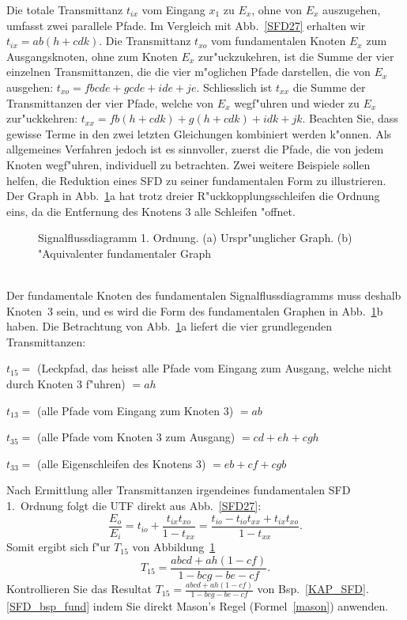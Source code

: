 \nit Die totale Transmittanz $t_{ix}$ vom Eingang $x_1$ zu $E_x$, ohne
von $E_x$ auszugehen, umfasst zwei parallele Pfade. Im Vergleich mit
Abb.~\ref{SFD27} erhalten wir $t_{ix}=ab(h+cdk)$. Die Transmittanz
$t_{xo}$ vom fundamentalen Knoten $E_x$ zum Ausgangsknoten, ohne zum
Knoten $E_x$ zur"uckzukehren, ist die Summe der vier einzelnen
Transmittanzen, die die vier m"oglichen Pfade darstellen, die von
$E_x$ ausgehen: $t_{xo}=fbcde+gcde+ide+je$. Schliesslich ist $t_{xx}$
die Summe der Transmittanzen der vier Pfade, welche von $E_x$
wegf"uhren und wieder zu $E_x$ zur"uckkehren:
$t_{xx}=fb(h+cdk)+g(h+cdk)+idk+jk$. Beachten Sie, dass gewisse Terme
in den zwei letzten Gleichungen kombiniert werden k"onnen. Als
allgemeines Verfahren jedoch ist es sinnvoller, zuerst die Pfade, die
von jedem Knoten wegf"uhren, individuell zu betrachten.
\newpage
\bsp{}\label{SFD_bsp_fund}Zwei weitere Beispiele sollen helfen, die Reduktion eines
 SFD zu seiner fundamentalen Form zu illustrieren. Der
Graph in Abb.~\ref{SFD29}a hat trotz dreier R"uckkopplungsschleifen
die Ordnung eins, da die Entfernung des Knotens 3 alle Schleifen
"offnet. \\
\begin{figure}[htb!]
\begin{center}
  \caption{Signalflussdiagramm 1.  Ordnung.  (a) Urspr"unglicher Graph. (b)
"Aquivalenter fundamentaler Graph}\label{SFD29}
\end{center}
\vspace*{-7mm}
\end{figure}\\
\nit Der fundamentale Knoten des fundamentalen
Signalflussdiagramms muss deshalb Knoten~3 sein, und es wird die Form
des fundamentalen Graphen in Abb.~\ref{SFD29}b haben. Die Betrachtung von
Abb.~\ref{SFD29}a liefert die vier grundlegenden Transmittanzen:\\
\begin{description}
\item $t_{15}=$ (Leckpfad, das heisst alle Pfade vom Eingang zum Ausgang, welche nicht
durch Knoten 3 f"uhren) $= ah$ 
\item $t_{13}=$ (alle Pfade vom Eingang zum Knoten
3) $= ab$ 
\item $t_{35}=$ (alle Pfade vom Knoten 3 zum Ausgang) $= cd + eh + cgh$
\item $t_{33}=$ (alle Eigenschleifen des Knotens 3) $= eb + cf + cgb$
\end{description}
\nit Nach Ermittlung aller Transmittanzen irgendeines fundamentalen
SFD 1.~Ordnung folgt die UTF direkt
aus Abb.~\ref{SFD27}:
\begin{equation}
 \frac{E_o}{E_i}=t_{io}+\frac{t_{ix}t_{xo}}{1-t_{xx}}=\frac{t_{io}-t_{io}t_{xx}+t_{ix}t_{xo}}{1-t_{xx}}.\label{sfd_equ1}
\end{equation}
\nit Somit ergibt sich f"ur $T_{15}$ von Abbildung~\ref{SFD29} 
\begin{equation*}
 T_{15}=\frac{abcd+ah(1-cf)}{1-bcg-be-cf}.
\end{equation*}
\aufg
Kontrollieren Sie das Resultat $T_{15}=\frac{abcd+ah(1-cf)}{1-bcg-be-cf}$ von Bsp.~\ref{KAP_SFD}.\ref{SFD_bsp_fund} indem Sie direkt Mason's Regel (Formel~\ref{mason}) anwenden.

